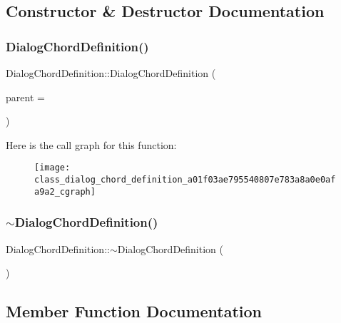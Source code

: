 \subsection{Constructor \& Destructor Documentation}
\mbox{\label{class_dialog_chord_definition_a01f03ae795540807e783a8a0e0afa9a2}} 
\subsubsection{Dialog\+Chord\+Definition()}
{\footnotesize\ttfamily Dialog\+Chord\+Definition\+::\+Dialog\+Chord\+Definition (\begin{DoxyParamCaption}\item[{Q\+Widget $\ast$}]{parent = {} }\end{DoxyParamCaption})\hspace{0.3cm}{\ttfamily [explicit]}}

Here is the call graph for this function\+:\nopagebreak
\begin{figure}[H]
\begin{center}
\leavevmode
\texttt{[image: class\_dialog\_chord\_definition\_a01f03ae795540807e783a8a0e0afa9a2\_cgraph]}
\end{center}
\end{figure}
\mbox{\label{class_dialog_chord_definition_a5a26fa1ceb8e4802e5c4d8d04db7b92f}} 
\subsubsection{$\sim$\+Dialog\+Chord\+Definition()}
{\footnotesize\ttfamily Dialog\+Chord\+Definition\+::$\sim$\+Dialog\+Chord\+Definition (\begin{DoxyParamCaption}{ }\end{DoxyParamCaption})}



\subsection{Member Function Documentation}
\mbox{\label{class_dialog_chord_definition_a0c0c9122565ddcac862ca32851a52963}} 
